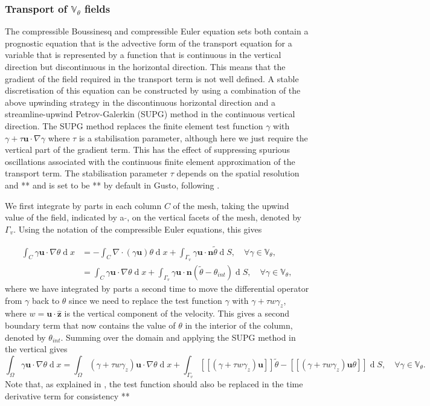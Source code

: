 \documentclass[journal abbreviation, manuscript]{copernicus}
\def\MM#1{\boldsymbol{#1}}
\DeclareMathOperator{\diff}{d}
\newcommand{\jump}[1]{[\![#1]\!]}
\begin{document}
\subsubsection{Transport of $\mathbb{V}_\theta$ fields}
\label{subsec: theta transport}
The compressible Boussinesq and compressible Euler equation sets both
contain a prognostic equation that is the advective form of the
transport equation for a variable that is represented by a function
that is continuous in the vertical direction but discontinuous in the
horizontal direction. This means that the gradient of the field
required in the transport term is not well defined. A stable
discretisation of this equation can be constructed by using a
combination of the above upwinding strategy in the discontinuous
horizontal direction and a streamline-upwind Petrov-Galerkin (SUPG)
method in the continuous vertical direction. The SUPG method replaces
the finite element test function $\gamma$ with $\gamma + \tau
\MM{u}\cdot\nabla\gamma$ where $\tau$ is a stabilisation parameter,
although here we just require the vertical part of the gradient term. This
has the effect of suppressing spurious oscillations associated with the
continuous finite element approximation of the transport term. The
stabilisation parameter $\tau$ depends on the spatial resolution and
** and is set to be ** by default in Gusto, following \citet{}.

We first integrate by parts in each column $C$ of the mesh, taking the
upwind value of the field, indicated by a $\tilde{}$, on the vertical
facets of the mesh, denoted by $\Gamma_v$. Using the notation of the
compressible Euler equations, this gives

\begin{align}
  \int_C \gamma\MM{u}\cdot\nabla\theta\diff x &= -\int_C \nabla\cdot(\gamma\MM{u})\theta \diff x + \int_{\Gamma_v}\gamma \MM{u}\cdot\MM{n}\tilde{\theta}\diff S, \quad \forall \gamma \in \mathbb{V}_\theta, \\
  &= \int_C \gamma\MM{u}\cdot\nabla\theta \diff x + \int_{\Gamma_v}\gamma \MM{u}\cdot\MM{n}(\tilde{\theta}-\theta_{int})\diff S, \quad \forall \gamma \in \mathbb{V}_\theta,
\end{align}
where we have integrated by parts a second time to move the
differential operator from $\gamma$ back to $\theta$ since we need to
replace the test function $\gamma$ with $\gamma+\tau w\gamma_z$, where
$w=\MM{u}\cdot\hat{\MM{z}}$ is the vertical component of the
velocity. This gives a second boundary term that now contains the
value of $\theta$ in the interior of the column, denoted by
$\theta_{int}$. Summing over the domain and applying the SUPG method
in the vertical gives
\begin{equation}
  \int_\Omega \gamma\MM{u}\cdot\nabla\theta\diff x =\int_\Omega(\gamma+\tau w\gamma_z)\MM{u}\cdot\nabla\theta \diff x + \int_{\Gamma_v}\jump{(\gamma+\tau w\gamma_z) \MM{u}}\tilde{\theta}-\jump{(\gamma+\tau w\gamma_z) \MM{u}\theta}\diff S, \quad \forall \gamma \in \mathbb{V}_\theta.
\end{equation}
Note that, as explained in \citet{Colin}, the test function should
also be replaced in the time derivative term for consistency **
  
\end{document}
